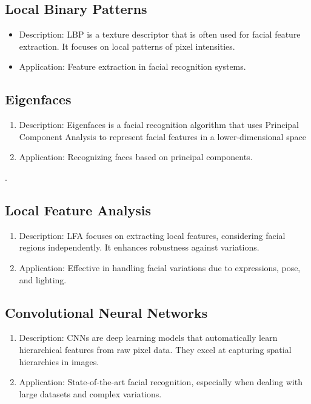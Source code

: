  \subsection{Local Binary Patterns }
   \begin{itemize}
           \item Description: LBP is a texture descriptor that is often used for facial feature extraction. It focuses on local patterns of pixel intensities.
\item Application: Feature extraction in facial recognition systems.

   \end{itemize}



\subsection{Eigenfaces}
\begin{enumerate}
    \item Description: Eigenfaces is a facial recognition algorithm that uses Principal Component Analysis  to represent facial features in a lower-dimensional space
\item Application: Recognizing faces based on principal components.
\end{enumerate}.

\subsection{Local Feature Analysis }
\begin{enumerate}
    \item Description: LFA focuses on extracting local features, considering facial regions independently. It enhances robustness against variations.
    \item Application: Effective in handling facial variations due to expressions, pose, and lighting.
\end{enumerate}

\subsection{Convolutional Neural Networks}
\begin{enumerate}
    \item Description: CNNs are deep learning models that automatically learn hierarchical features from raw pixel data. They excel at capturing spatial hierarchies in images.
\item Application: State-of-the-art facial recognition, especially when dealing with large datasets and complex variations.
\end{enumerate}

